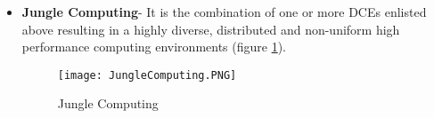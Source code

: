 \begin{itemize}
\item \textbf{Jungle Computing}- It is the combination of one or more DCEs enlisted above resulting in a highly diverse, distributed and non-uniform high performance computing environments (figure \ref{fig:JungleComputing}).  

\begin{figure}[ht!]
\centering
\texttt{[image: JungleComputing.PNG]}
\caption{Jungle Computing}
\label{fig:JungleComputing}
\end{figure}

\end{itemize}

